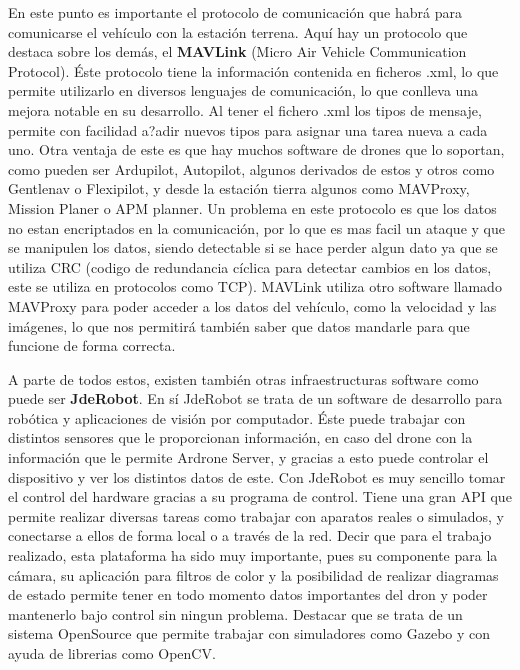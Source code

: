 \hspace{1 cm} En este punto es importante el protocolo de comunicaci\'on que habr\'a para comunicarse el veh\'iculo con la estaci\'on terrena. Aqu\'i hay un protocolo que destaca sobre los dem\'as, el \textbf{MAVLink} (Micro Air Vehicle Communication Protocol). \'Este protocolo tiene la informaci\'on contenida en ficheros .xml, lo que permite utilizarlo en diversos lenguajes de comunicaci\'on, lo que conlleva una mejora notable en su desarrollo. Al tener el fichero .xml los tipos de mensaje, permite con facilidad a?adir nuevos tipos para asignar una tarea nueva a cada uno. Otra ventaja de este es que hay muchos software de drones que lo soportan, como pueden ser Ardupilot, Autopilot, algunos derivados de estos y otros como Gentlenav o Flexipilot, y desde la estaci\'on tierra algunos como MAVProxy, Mission Planer o APM planner. 
Un problema en este protocolo es que los datos no estan encriptados en la comunicaci\'on, por lo que es mas facil un ataque y que se manipulen los datos, siendo detectable si se hace perder algun dato ya que se utiliza CRC (codigo de redundancia c\'iclica para detectar cambios en los datos, este se utiliza en protocolos como TCP).
MAVLink utiliza otro software llamado MAVProxy para poder acceder a los datos del veh\'iculo, como la velocidad y las im\'agenes, lo que nos permitir\'a tambi\'en saber que datos mandarle para que funcione de forma correcta. 

\hspace{1 cm} A parte de todos estos, existen tambi\'en otras infraestructuras software como puede ser \textbf{JdeRobot}. En s\'i JdeRobot se trata de un software de desarrollo para rob\'otica y aplicaciones de visi\'on por computador. \'Este puede trabajar con distintos sensores que le proporcionan informaci\'on, en caso del drone con la informaci\'on que le permite Ardrone Server, y gracias a esto puede controlar el dispositivo y ver los distintos datos de este. Con JdeRobot es muy sencillo tomar el control del hardware gracias a su programa de control. Tiene una gran API que permite realizar diversas tareas como trabajar con aparatos reales o simulados, y conectarse a ellos de forma local o a trav\'es de la red. Decir que para el trabajo realizado, esta plataforma ha sido muy importante, pues su componente para la c\'amara, su aplicaci\'on para filtros de color y la posibilidad de realizar diagramas de estado permite tener en todo momento datos importantes del dron y poder mantenerlo bajo control sin ningun problema. Destacar que se trata de un sistema OpenSource que permite trabajar con simuladores como Gazebo y con ayuda de librerias como OpenCV. 
 

